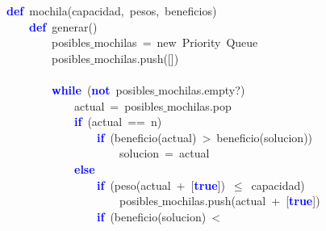 \noindent
\mbox{}\textbf{\textcolor{Blue}{def}}\ mochila\textcolor{BrickRed}{(}capacidad\textcolor{BrickRed}{,}\ pesos\textcolor{BrickRed}{,}\ beneficios\textcolor{BrickRed}{)} \\
\mbox{}\ \ \ \ \textbf{\textcolor{Blue}{def}}\ generar\textcolor{BrickRed}{()} \\
\mbox{}\ \ \ \ \ \ \ \ posibles$\_$mochilas\ \textcolor{BrickRed}{=}\ new\ Priority\ Queue \\
\mbox{}\ \ \ \ \ \ \ \ posibles$\_$mochilas\textcolor{BrickRed}{.}push\textcolor{BrickRed}{([])} \\
\mbox{} \\
\mbox{}\ \ \ \ \ \ \ \ \textbf{\textcolor{Blue}{while}}\ \textcolor{BrickRed}{(}\textbf{\textcolor{Blue}{not}}\ posibles$\_$mochilas\textcolor{BrickRed}{.}empty?\textcolor{BrickRed}{)} \\
\mbox{}\ \ \ \ \ \ \ \ \ \ \ \ actual\ \textcolor{BrickRed}{=}\ posibles$\_$mochilas\textcolor{BrickRed}{.}pop \\
\mbox{}\ \ \ \ \ \ \ \ \ \ \ \ \textbf{\textcolor{Blue}{if}}\ \textcolor{BrickRed}{(}actual\ \textcolor{BrickRed}{==}\ n\textcolor{BrickRed}{)} \\
\mbox{}\ \ \ \ \ \ \ \ \ \ \ \ \ \ \ \ \textbf{\textcolor{Blue}{if}}\ \textcolor{BrickRed}{(}beneficio\textcolor{BrickRed}{(}actual\textcolor{BrickRed}{)}\ \textcolor{BrickRed}{\textgreater{}}\ beneficio\textcolor{BrickRed}{(}solucion\textcolor{BrickRed}{))} \\
\mbox{}\ \ \ \ \ \ \ \ \ \ \ \ \ \ \ \ \ \ \ \ solucion\ \textcolor{BrickRed}{=}\ actual \\
\mbox{}\ \ \ \ \ \ \ \ \ \ \ \ \textbf{\textcolor{Blue}{else}} \\
\mbox{}\ \ \ \ \ \ \ \ \ \ \ \ \ \ \ \ \textbf{\textcolor{Blue}{if}}\ \textcolor{BrickRed}{(}peso\textcolor{BrickRed}{(}actual\ \textcolor{BrickRed}{+}\ \textcolor{BrickRed}{[}\textbf{\textcolor{Blue}{true}}\textcolor{BrickRed}{])}\ \textcolor{BrickRed}{$\le$}\ capacidad\textcolor{BrickRed}{)} \\
\mbox{}\ \ \ \ \ \ \ \ \ \ \ \ \ \ \ \ \ \ \ \ posibles$\_$mochilas\textcolor{BrickRed}{.}push\textcolor{BrickRed}{(}actual\ \textcolor{BrickRed}{+}\ \textcolor{BrickRed}{[}\textbf{\textcolor{Blue}{true}}\textcolor{BrickRed}{])} \\
\mbox{}\ \ \ \ \ \ \ \ \ \ \ \ \ \ \ \ \textbf{\textcolor{Blue}{if}}\ \textcolor{BrickRed}{(}beneficio\textcolor{BrickRed}{(}solucion\textcolor{BrickRed}{)}\ \textcolor{BrickRed}{\textless{}}\\
